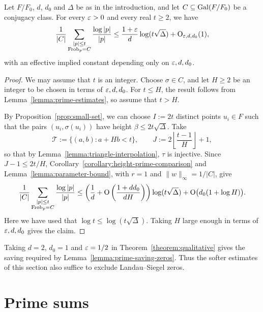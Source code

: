\documentclass[reqno]{amsart} 
\begin{document}
\begin{theorem}\label{theorem:qualitative}
  Let $F/F_0$, $d$, $d_0$ and $\Delta$ be as in the introduction, and let $C\subseteq\operatorname{Gal}(F/F_0)$ be a conjugacy class.  For every $\varepsilon>0$ and every real $t\geq2$, we have
  \begin{equation}\label{eq:cus646uh7v}
    \frac1{|C|}\sum_{\substack{|p|\leq t\\\operatorname{Frob}_p=C}}
    \frac{\log|p|}{|p|}
    \leq \frac{1+\varepsilon}{d}\log(t\sqrt\Delta)
    +\operatorname{O}_{\varepsilon,d,d_0}(1),
  \end{equation}
  with an effective implied constant depending only on $\varepsilon,d,d_0$.
\end{theorem}
\begin{proof}
  We may assume that $t$ is an integer.  Choose $\sigma\in C$, and let $H\geq2$ be an integer to be chosen in terms of $\varepsilon,d,d_0$.  For $t\leq H$, the result follows from Lemma~\ref{lemma:prime-estimates}, so assume that $t>H$.

  By Proposition~\ref{prop:small-set}, we can choose $I:=2t$ distinct points $u_i\in F$ such that the pairs $(u_i,\sigma(u_i))$ have height $\beta\leq2t\sqrt\Delta$.  Take
  \begin{equation*}
    \mathcal{T}:=\{(a,b):a+Hb<t\},\qquad
    J:=2\left\lfloor\frac{t-1}{H}\right\rfloor+1,
  \end{equation*}
  so that by Lemma~\ref{lemma:triangle-interpolation}, $\tau$ is injective.  Since $J-1\leq2t/H$, Corollary~\ref{corollary:height-prime-comparison} and Lemma~\ref{lemma:parameter-bound}, with $r=1$ and $\lVert w\rVert_\infty=1/|C|$, give
  \begin{equation*}
    \frac1{|C|}\sum_{\substack{|p|\leq t\\\operatorname{Frob}_p=C}}\frac{\log|p|}{|p|}
    \leq\left(\frac1d+\operatorname{O}\left(\frac{1+dd_0}{dH}\right)\right)
    \log(t\sqrt\Delta)+\operatorname{O}\bigl(d_0(1+\log H)\bigr).
  \end{equation*}
  Here we have used that $\log t\leq\log(t\sqrt\Delta)$.  Taking $H$ large enough in terms of $\varepsilon,d,d_0$ gives the claim.
\end{proof}

Taking $d=2$, $d_0=1$ and $\varepsilon=1/2$ in Theorem~\ref{theorem:qualitative} gives the saving required by Lemma~\ref{lemma:prime-saving-zeros}.  Thus the softer estimates of this section also suffice to exclude Landau--Siegel zeros.

\appendix

\section{Prime sums}\label{appendix:prime-estimates}
\end{document}
